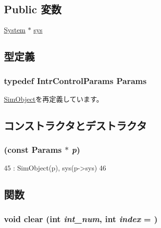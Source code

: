 \subsection*{Public 変数}
\begin{DoxyCompactItemize}
\item 
\hyperlink{classSystem}{System} $\ast$ \hyperlink{classIntrControl_a8ae37465ba84acfef6af3e9b9e6dbbd5}{sys}
\end{DoxyCompactItemize}


\subsection{型定義}
\hypertarget{classIntrControl_afd5ff96050f97729223377021ae69b8f}{
\subsubsection[{Params}]{\setlength{\rightskip}{0pt plus 5cm}typedef IntrControlParams {\bf Params}}}
\label{classIntrControl_afd5ff96050f97729223377021ae69b8f}


\hyperlink{classSimObject_a0f0761d2db586a23bb2a2880b8f387bb}{SimObject}を再定義しています。

\subsection{コンストラクタとデストラクタ}
\hypertarget{classIntrControl_a9e818793118edc46a25d5807eb1f9b45}{
\subsubsection[{IntrControl}]{ (const {\bf Params} $\ast$ {\em p})}}
\label{classIntrControl_a9e818793118edc46a25d5807eb1f9b45}



\begin{DoxyCode}
45     : SimObject(p), sys(p->sys)
46 {}
\end{DoxyCode}


\subsection{関数}
\hypertarget{classIntrControl_a098e2b8c60729263ec5c391565c9828d}{
\subsubsection[{clear}]{\setlength{\rightskip}{0pt plus 5cm}void clear (int {\em int\_\-num}, \/  int {\em index} = {})}}
\label{classIntrControl_a098e2b8c60729263ec5c391565c9828d}



